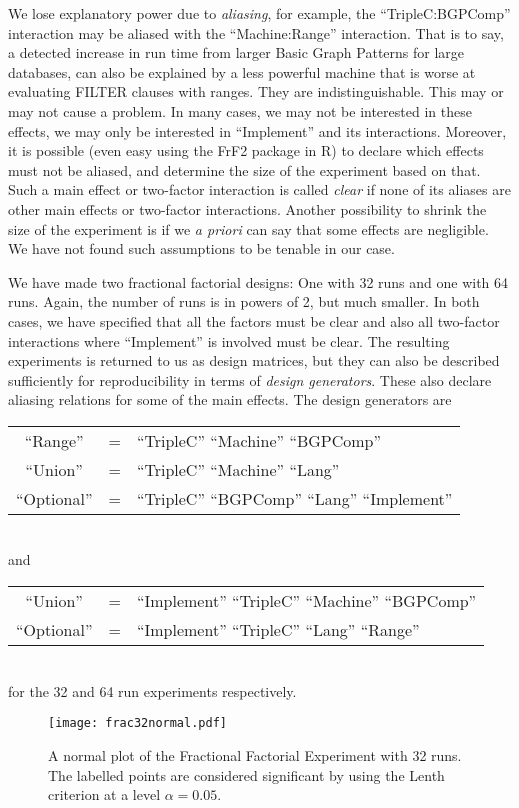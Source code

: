 \documentclass{llncs}
\begin{document}
We lose explanatory power due to \emph{aliasing}, for example, the
``TripleC:BGPComp'' interaction may be aliased with the
``Machine:Range'' interaction. That is to say, a detected increase in
run time from larger Basic Graph Patterns for large databases, can
also be explained by a less powerful machine that is worse at
evaluating FILTER clauses with ranges. They are
indistinguishable. This may or may not cause a problem. In many cases,
we may not be interested in these effects, we may only be interested
in ``Implement'' and its interactions. Moreover, it is possible (even
easy using the FrF2 package in R) to declare which effects must not be
aliased, and determine the size of the experiment based on that. Such
a main effect or two-factor interaction is called \emph{clear} if none
of its aliases are other main effects or two-factor
interactions. Another possibility to shrink the size of the experiment
is if we \textit{a priori} can say that some effects are
negligible. We have not found such assumptions to be tenable in our
case.

We have made two fractional factorial designs: One with 32 runs and
one with 64 runs. Again, the number of runs is in powers of 2, but
much smaller. In both cases, we have specified that all the factors
must be clear and also all two-factor interactions where ``Implement''
is involved must be clear. The resulting experiments is returned to us
as design matrices, but they can also be described sufficiently for
reproducibility in terms of \emph{design generators}. These also
declare aliasing relations for some of the main effects. The design
generators are\\
\begin{tabular}{ccl}
``Range'' &=& ``TripleC'' ``Machine'' ``BGPComp'' \\  
``Union'' &=& ``TripleC'' ``Machine'' ``Lang'' \\  
``Optional'' &=& ``TripleC'' ``BGPComp'' ``Lang'' ``Implement'' 
\end{tabular}
\\and\\
\begin{tabular}{ccl}
``Union'' &=& ``Implement''  ``TripleC''  ``Machine'' ``BGPComp'' \\
``Optional'' &=& ``Implement''  ``TripleC'' ``Lang''  ``Range'' 
\end{tabular}
\\for the 32 and 64 run experiments respectively.

\begin{figure}[h!]
  \texttt{[image: frac32normal.pdf]}
  \caption{A normal plot of the Fractional Factorial Experiment with
    32 runs. The labelled points are considered significant by using
    the Lenth criterion at a level
    $\alpha=0.05$.}\label{fig:frac32normal}
\end{figure}
\end{document}

